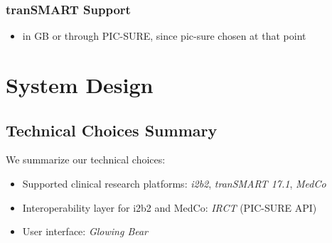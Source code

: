 












\subsubsection*{tranSMART Support}
\begin{itemize}
    \item in GB or through PIC-SURE, since pic-sure chosen at that point
\end{itemize}



\section{System Design}

\subsection{Technical Choices Summary}

We summarize our technical choices:

\begin{itemize}
    \item Supported clinical research platforms: \emph{i2b2}, \emph{tranSMART 17.1}, \emph{MedCo}
    \item Interoperability layer for i2b2 and MedCo: \emph{IRCT} (PIC-SURE API)
    \item User interface: \emph{Glowing Bear}
\end{itemize}


